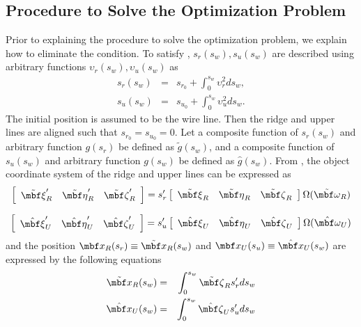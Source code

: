 \documentclass[E]{scitrans}
\begin{document}
\subsection*{Procedure to Solve the Optimization Problem}
Prior to explaining the procedure to solve the optimization problem, we explain how to eliminate the condition. To satisfy  , $ s_r (s_w),s_u (s_w) $ are described using arbitrary functions $ \upsilon_r(s_w),\upsilon_u(s_w) $ as
\begin{eqnarray}
s_r(s_w) &=& s_{r_0} + \int_{0}^{s_w} \upsilon_r^2 ds_w, \\
s_u(s_w) &=& s_{u_0} + \int_{0}^{s_w} \upsilon_u^2 ds_w. 
\end{eqnarray}
The initial position is assumed to be the wire line. Then the ridge and upper lines are aligned such that $ s_{r_0}=s_{u_0}=0 $. Let a composite function of $ s_r(s_w) $ and arbitrary function $ g(s_r) $ be defined as $ \tilde{g}(s_w) $, and a composite function of $ s_u (s_w ) $ and arbitrary function $ g(s_w) $ be defined as $ \hat{g}(s_w) $. From , the object coordinate system of the ridge and upper lines can be expressed as 
\begin{equation}\label{eq:tildeobj}
\left[\begin{array}{ccc} \tilde{\xivec}_R' & \tilde{\etavec}_R' & \tilde{\zetavec}_R' \end{array}\right] = s_r' \left[\begin{array}{ccc} \tilde{\xivec}_R & \tilde{\etavec}_R & \tilde{\zetavec}_R \end{array} \right] \Omega(\tilde{\mbold{\omega}}_R)
\end{equation}

\begin{equation}\label{eq:hatobj}
\left[\begin{array}{ccc} \hat{\xivec}_U' & \hat{\etavec}_U' & \hat{\zetavec}_U' \end{array}\right] = s_u' \left[\begin{array}{ccc} \hat{\xivec}_U & \hat{\etavec}_U & \hat{\zetavec}_U \end{array} \right] \Omega(\hat{\mbold{\omega}}_U)
\end{equation}
and the position $ \mbold{x}_R(s_r) \equiv \tilde{\mbold{x}}_R(s_w) $ and $ \mbold{x}_U(s_u) \equiv \hat{\mbold{x}}_U(s_w) $ are expressed by the following equations
\begin{eqnarray}
\tilde{\mbold{x}}_R(s_w) &=& \int_{0}^{s_w} \tilde{\zetavec}_R s_r' ds_w \\
\hat{\mbold{x}}_U(s_w) &=& \int_{0}^{s_w} \hat{\zetavec}_U s_u' ds_w
\end{eqnarray}
\end{document}
